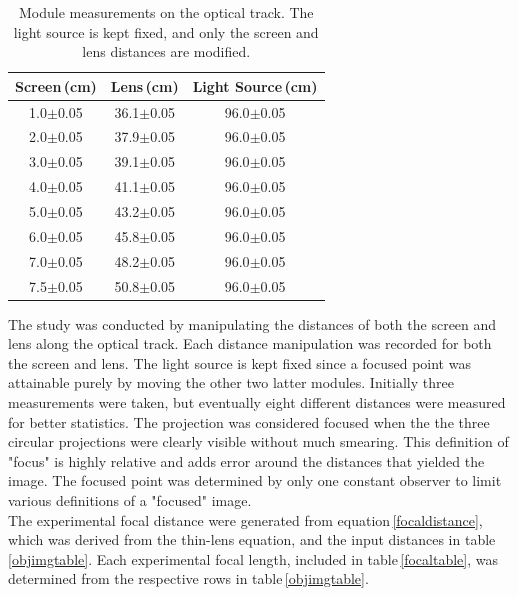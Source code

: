 \documentclass[twocolumn]{aastex6}
\begin{document}
\begin{table}[h]
\begin{center}
\caption{Module measurements on the optical track. The light source is kept fixed, and only the screen and lens distances are modified.}

\begin{tabular}{ c|c|c }

Screen\,(cm) & Lens\,(cm) & Light Source\,(cm) \\ \hline \hline
 1.0$\pm$0.05 & 36.1$\pm$0.05 & 96.0$\pm$0.05 \\
 2.0$\pm$0.05 & 37.9$\pm$0.05 & 96.0$\pm$0.05  \\ 
 3.0$\pm$0.05 & 39.1$\pm$0.05 & 96.0$\pm$0.05  \\  
 4.0$\pm$0.05 & 41.1$\pm$0.05 & 96.0$\pm$0.05  \\ 
 5.0$\pm$0.05 & 43.2$\pm$0.05 & 96.0$\pm$0.05  \\ 
 6.0$\pm$0.05 & 45.8$\pm$0.05 & 96.0$\pm$0.05  \\ 
 7.0$\pm$0.05 & 48.2$\pm$0.05 & 96.0$\pm$0.05  \\ 
 7.5$\pm$0.05 & 50.8$\pm$0.05 & 96.0$\pm$0.05  \\ 

\end{tabular}
\label{raw}
\end{center}
\end{table}



The study was conducted by manipulating the distances of both the screen and lens along the optical track. Each distance manipulation was recorded for both the screen and lens. The light source is kept fixed since a focused point was attainable purely by moving the other two latter modules. Initially three measurements were taken, but eventually eight different distances were measured for better statistics. The projection was considered focused when the the three circular projections were clearly visible without much smearing. This definition of "focus" is highly relative and adds error around the distances that yielded the image. The focused point was determined by only one constant observer to limit various definitions of a "focused" image.
\\
\indent The experimental focal distance were generated from equation\,\ref{focaldistance}, which was derived from the thin-lens equation, and the input distances in table\,\ref{objimgtable}. Each experimental focal length, included in table\,\ref{focaltable}, was determined from the respective rows in table\,\ref{objimgtable}.
\end{document}
